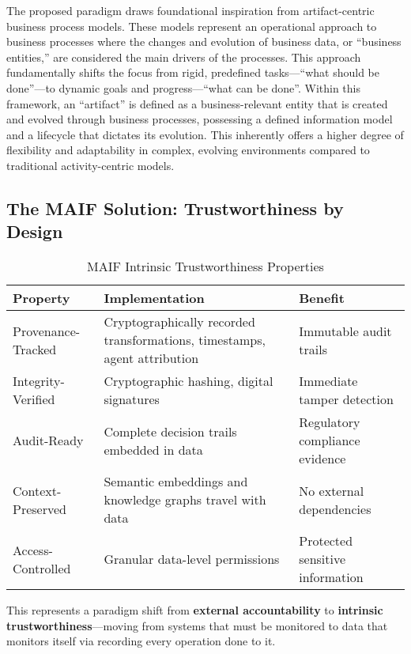\documentclass[conference]{IEEEtran}
\begin{document}
The proposed paradigm draws foundational inspiration from artifact-centric business process models. These models represent an operational approach to business processes where the changes and evolution of business data, or ``business entities,'' are considered the main drivers of the processes\cite{ref10}. This approach fundamentally shifts the focus from rigid, predefined tasks---``what should be done''---to dynamic goals and progress---``what can be done''\cite{ref12}. Within this framework, an ``artifact'' is defined as a business-relevant entity that is created and evolved through business processes, possessing a defined information model and a lifecycle that dictates its evolution\cite{ref12}. This inherently offers a higher degree of flexibility and adaptability in complex, evolving environments compared to traditional activity-centric models\cite{ref12}.


\subsection{The MAIF Solution: Trustworthiness by Design}

\begin{table*}[!t]
\renewcommand{\arraystretch}{1.3}
\caption{MAIF Intrinsic Trustworthiness Properties}
\label{tab:maif-trustworthiness}
\centering
\footnotesize
\begin{tabular}{p{3cm}p{6cm}p{5cm}}
\toprule
\textbf{Property} & \textbf{Implementation} & \textbf{Benefit} \\
\midrule
Provenance-Tracked & Cryptographically recorded transformations, timestamps, agent attribution & Immutable audit trails \\
Integrity-Verified & Cryptographic hashing, digital signatures & Immediate tamper detection \\
Audit-Ready & Complete decision trails embedded in data & Regulatory compliance evidence \\
Context-Preserved & Semantic embeddings and knowledge graphs travel with data & No external dependencies \\
Access-Controlled & Granular data-level permissions & Protected sensitive information \\
\bottomrule
\end{tabular}
\end{table*}

This represents a paradigm shift from \textbf{external accountability} to \textbf{intrinsic trustworthiness}—moving from systems that must be monitored to data that monitors itself via recording every operation done to it.
\end{document}
